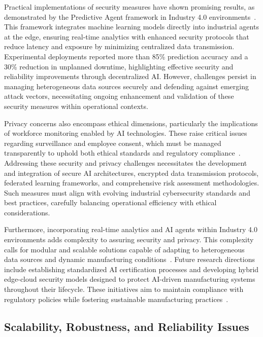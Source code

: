 \documentclass[sigconf]{acmart}
\begin{document}
Practical implementations of security measures have shown promising results, as demonstrated by the Predictive Agent framework in Industry 4.0 environments~\cite{ref37}. This framework integrates machine learning models directly into industrial agents at the edge, ensuring real-time analytics with enhanced security protocols that reduce latency and exposure by minimizing centralized data transmission. Experimental deployments reported more than 85\% prediction accuracy and a 30\% reduction in unplanned downtime, highlighting effective security and reliability improvements through decentralized AI. However, challenges persist in managing heterogeneous data sources securely and defending against emerging attack vectors, necessitating ongoing enhancement and validation of these security measures within operational contexts.

Privacy concerns also encompass ethical dimensions, particularly the implications of workforce monitoring enabled by AI technologies. These raise critical issues regarding surveillance and employee consent, which must be managed transparently to uphold both ethical standards and regulatory compliance~\cite{ref2}. Addressing these security and privacy challenges necessitates the development and integration of secure AI architectures, encrypted data transmission protocols, federated learning frameworks, and comprehensive risk assessment methodologies. Such measures must align with evolving industrial cybersecurity standards and best practices, carefully balancing operational efficiency with ethical considerations.

Furthermore, incorporating real-time analytics and AI agents within Industry 4.0 environments adds complexity to assuring security and privacy. This complexity calls for modular and scalable solutions capable of adapting to heterogeneous data sources and dynamic manufacturing conditions~\cite{ref37}. Future research directions include establishing standardized AI certification processes and developing hybrid edge-cloud security models designed to protect AI-driven manufacturing systems throughout their lifecycle. These initiatives aim to maintain compliance with regulatory policies while fostering sustainable manufacturing practices~\cite{ref41}.

\subsection{Scalability, Robustness, and Reliability Issues}
\end{document}
